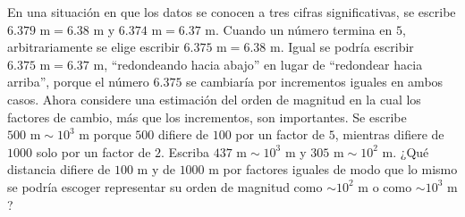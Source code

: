 \item En una situación en que los datos se conocen a tres cifras significativas, se escribe $6.379 \text{ m} = 6.38 \text{ m}$ y $6.374 \text{ m} = 6.37 \text{ m}$. Cuando un número termina en $5$, arbitrariamente se elige escribir $6.375 \text{ m} = 6.38 \text{ m}$. Igual se podría escribir $6.375 \text{ m} = 6.37 \text{ m}$, ``redondeando hacia abajo'' en lugar de ``redondear hacia arriba'', porque el número $6.375$ se cambiaría por incrementos iguales en ambos casos. Ahora considere una estimación del orden de magnitud en la cual los factores de cambio, más que los incrementos, son importantes. Se escribe $500 \text{ m} \sim 10^3 \text{ m}$ porque $500$ difiere de $100$ por un factor de $5$, mientras difiere de $1000$ solo por un factor de $2$. Escriba $437 \text{ m} \sim 10^3 \text{ m}$ y $305 \text{ m} \sim 10^2 \text{ m}$. ¿Qué distancia difiere de $100 \text{ m}$ y de $1000 \text{ m}$ por factores iguales de modo que lo mismo se podría escoger representar su orden de magnitud como $\sim 10^2 \text{ m}$ o como $\sim 10^3 \text{ m}$?

